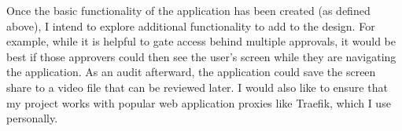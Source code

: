 \documentclass[12pt]{article}
\begin{document}
Once the basic functionality of the application has been created (as defined above), I intend to explore additional functionality to add to the design. For example, while it is helpful to gate access behind multiple approvals, it would be best if those approvers could then see the user's screen while they are navigating the application. As an audit afterward, the application could save the screen share to a video file that can be reviewed later. I would also like to ensure that my project works with popular web application proxies like Traefik, which I use personally.
\end{document}

